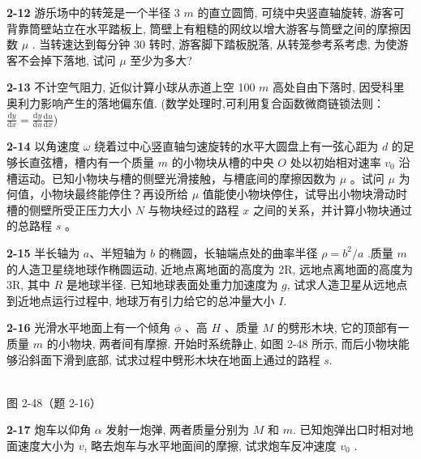 \newpage

\textbf{2-12} 游乐场中的转笼是一个半径 3 $m$ 的直立圆筒, 可绕中央竖直轴旋转, 游客可背靠筒壁站立在水平踏板上, 筒壁上有粗糙的网纹以增大游客与筒壁之间的摩擦因数 $\mu$ . 当转速达到每分钟 30 转时, 游客脚下踏板脱落, 从转笼参考系考虑, 为使游客不会掉下落地, 试问 $\mu$ 至少为多大?

\newpage

\textbf{2-13} 不计空气阻力, 近似计算小球从赤道上空 100 $m$ 高处自由下落时, 因受科里奥利力影响产生的落地偏东值. (数学处理时,可利用复合函数微商链锁法则： $\frac{\mathrm{d}y}{\mathrm{d}x} = \frac{\mathrm{d}y}{\mathrm{d}u} \frac{\mathrm{d}u}{\mathrm{d}x}$)

\newpage

\textbf{2-14} 以角速度 $\omega$ 绕着过中心竖直轴匀速旋转的水平大圆盘上有一弦心距为 $d$ 的足够长直弦槽，槽内有一个质量 $m$ 的小物块从槽的中央 $O$ 处以初始相对速率 $v_{0}$ 沿槽运动。已知小物块与槽的侧壁光滑接触，与槽底间的摩擦因数为 $\mu$ 。试问 $\mu$ 为何值，小物块最终能停住？再设所给 $\mu$ 值能使小物块停住，试导出小物块滑动时槽的侧壁所受正压力大小 $N$ 与物块经过的路程 $x$ 之间的关系，并计算小物块通过的总路程 $s$ 。

\newpage

\textbf{2-15} 半长轴为 $a$、半短轴为 $b$ 的椭圆，长轴端点处的曲率半径 $\rho=b^{2}/a$ .质量 $m$ 的人造卫星绕地球作椭圆运动, 近地点离地面的高度为 2R, 远地点离地面的高度为 3R, 其中 $R$ 是地球半径. 已知地球表面处重力加速度为 $g$, 试求人造卫星从远地点到近地点运行过程中, 地球万有引力给它的总冲量大小 $I$.

\newpage

\textbf{2-16} 光滑水平地面上有一个倾角 $\phi$ 、高 $H$ 、质量 $M$ 的劈形木块, 它的顶部有一质量 $m$ 的小物块, 两者间有摩擦. 开始时系统静止, 如图 2-48 所示, 而后小物块能够沿斜面下滑到底部, 试求过程中劈形木块在地面上通过的路程 $s$.

\begin{center}
\resizebox{0.47\textwidth}{!}{}\\[4pt]
{\small 图 2-48（题 2-16）}
\end{center}

\newpage

\textbf{2-17} 炮车以仰角 $\alpha$ 发射一炮弹, 两者质量分别为 $M$ 和 $m$. 已知炮弹出口时相对地面速度大小为 $v$, 略去炮车与水平地面间的摩擦, 试求炮车反冲速度 $v_{0}$ .

